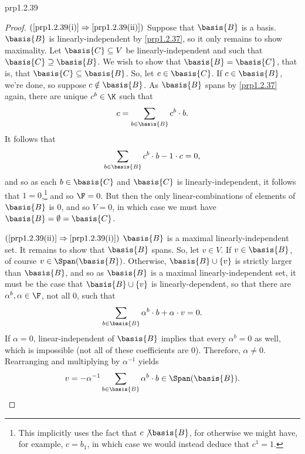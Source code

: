 \begin{prp}{}{prp1.2.39}
\begin{proof}
		\blni
		$(\cref{prp1.2.39(i)}\Rightarrow \cref{prp1.2.39(ii)})$ Suppose that $\basis{B}$ is a basis.  $\basis{B}$ is linearly-independent by \cref{prp1.2.37}, so it only remains to show maximality.  Let $\basis{C}\subseteq V$ be linearly-independent and such that $\basis{C}\supseteq \basis{B}$.  We wish to show that $\basis{B}=\basis{C}$, that is, that $\basis{C}\subseteq \basis{B}$.  So, let $c\in \basis{C}$.  If $c\in \basis{B}$, we're done, so suppose $c\notin \basis{B}$.  As $\basis{B}$ spans by \cref{prp1.2.37} again, there are unique $c^b\in \K$ such that
		\begin{equation}
			c=\sum _{b\in \basis{B}}c^b\cdot b.
		\end{equation}
		It follows that
		\begin{equation}
			\sum _{b\in \basis{B}}c^b\cdot b-1\cdot c=0,
		\end{equation}
		and so as each $b\in \basis{C}$ and $\basis{C}$ is linearly-independent, it follows that $1=0$,\footnote{This implicitly uses the fact that $c\not \basis{B}$, for otherwise we might have, for example, $c=b_1$, in which case we would instead deduce that $c^1=1$.} and so $\F =0$.  But then the only linear-combinations of elements of $\basis{B}$ is $0$, and so $V=0$, in which case we must have $\basis{B}=\emptyset =\basis{C}$.
		
		\blni
		$(\cref{prp1.2.39(ii)}\Rightarrow \cref{prp1.2.39(i)})$ $\basis{B}$ is a maximal linearly-independent set.  It remains to show that $\basis{B}$ spans.  So, let $v\in V$.  If $v\in \basis{B}$, of course $v\in \Span (\basis{B})$.  Otherwise, $\basis{B}\cup \{ v\}$ is strictly larger than $\basis{B}$, and so as $\basis{B}$ is a maximal linearly-independent set, it must be the case that $\basis{B}\cup \{ v\}$ is linearly-dependent, so that there are $\alpha ^b,\alpha \in \F$, not all $0$, such that
		\begin{equation}
			\sum _{b\in \basis{B}}\alpha ^b\cdot b+\alpha \cdot v=0.
		\end{equation}
		If $\alpha =0$, linear-independent of $\basis{B}$ implies that every $\alpha ^b=0$ as well, which is impossible (not all of these coefficients are $0$).  Therefore, $\alpha \neq 0$.  Rearranging and multiplying by $\alpha ^{-1}$ yields
		\begin{equation}
			v=-\alpha ^{-1}\sum _{b\in \basis{B}}\alpha ^b\cdot b\in \Span (\basis{B}).
		\end{equation}
		

\end{proof}
\end{prp}
